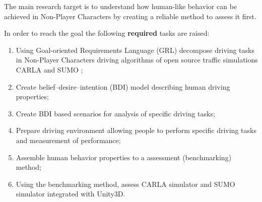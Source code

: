 \documentclass{VUMIFPS-master-intro}
\begin{document}

The main research target is to understand how human-like behavior can be achieved in Non-Player Characters by creating a reliable method to assess it first.

In order to reach the goal the following \textbf{required} tasks are raised:
\begin{enumerate}
	\item Using Goal-oriented Requirements Language (GRL) decompose driving tasks in Non-Player Characters driving algorithms of open source traffic simulations CARLA \cite{Dosovitskiy2017} and SUMO \cite{Biurrun2017};
	\item Create belief–desire–intention (BDI) model describing human driving properties;
	\item Create BDI based scenarios for analysis of specific driving tasks;
	\item Prepare driving environment allowing people to perform specific driving tasks and measurement of performance;
	\item Assemble human behavior properties to a assessment (benchmarking) method;
	\item Using the benchmarking method, assess CARLA simulator and SUMO simulator integrated with Unity3D.
\end{enumerate}


\end{document}
